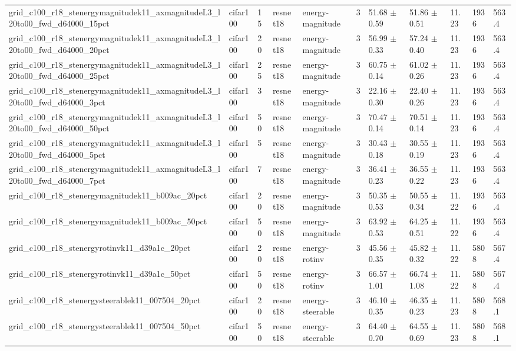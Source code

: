 \begin{tabular}{lllllllllll}
grid_c100_r18_stenergymagnitudek11_axmagnitudeL3_l20to00_fwd_d64000_15pct & cifar100 & 15 & resnet18 & energy-magnitude & 3 & 51.68 $\pm$ 0.59 & 51.86 $\pm$ 0.51 & 11.23 & 1936 & 563.4 \\
grid_c100_r18_stenergymagnitudek11_axmagnitudeL3_l20to00_fwd_d64000_20pct & cifar100 & 20 & resnet18 & energy-magnitude & 3 & 56.99 $\pm$ 0.33 & 57.24 $\pm$ 0.40 & 11.23 & 1936 & 563.4 \\
grid_c100_r18_stenergymagnitudek11_axmagnitudeL3_l20to00_fwd_d64000_25pct & cifar100 & 25 & resnet18 & energy-magnitude & 3 & 60.75 $\pm$ 0.14 & 61.02 $\pm$ 0.26 & 11.23 & 1936 & 563.4 \\
grid_c100_r18_stenergymagnitudek11_axmagnitudeL3_l20to00_fwd_d64000_3pct & cifar100 & 3 & resnet18 & energy-magnitude & 3 & 22.16 $\pm$ 0.30 & 22.40 $\pm$ 0.26 & 11.23 & 1936 & 563.4 \\
grid_c100_r18_stenergymagnitudek11_axmagnitudeL3_l20to00_fwd_d64000_50pct & cifar100 & 50 & resnet18 & energy-magnitude & 3 & 70.47 $\pm$ 0.14 & 70.51 $\pm$ 0.14 & 11.23 & 1936 & 563.4 \\
grid_c100_r18_stenergymagnitudek11_axmagnitudeL3_l20to00_fwd_d64000_5pct & cifar100 & 5 & resnet18 & energy-magnitude & 3 & 30.43 $\pm$ 0.18 & 30.55 $\pm$ 0.19 & 11.23 & 1936 & 563.4 \\
grid_c100_r18_stenergymagnitudek11_axmagnitudeL3_l20to00_fwd_d64000_7pct & cifar100 & 7 & resnet18 & energy-magnitude & 3 & 36.41 $\pm$ 0.23 & 36.55 $\pm$ 0.22 & 11.23 & 1936 & 563.4 \\
grid_c100_r18_stenergymagnitudek11_b009ac_20pct & cifar100 & 20 & resnet18 & energy-magnitude & 3 & 50.35 $\pm$ 0.53 & 50.55 $\pm$ 0.34 & 11.22 & 1936 & 563.4 \\
grid_c100_r18_stenergymagnitudek11_b009ac_50pct & cifar100 & 50 & resnet18 & energy-magnitude & 3 & 63.92 $\pm$ 0.53 & 64.25 $\pm$ 0.51 & 11.22 & 1936 & 563.4 \\
grid_c100_r18_stenergyrotinvk11_d39a1c_20pct & cifar100 & 20 & resnet18 & energy-rotinv & 3 & 45.56 $\pm$ 0.35 & 45.82 $\pm$ 0.32 & 11.22 & 5808 & 567.4 \\
grid_c100_r18_stenergyrotinvk11_d39a1c_50pct & cifar100 & 50 & resnet18 & energy-rotinv & 3 & 66.57 $\pm$ 1.01 & 66.74 $\pm$ 1.08 & 11.22 & 5808 & 567.4 \\
grid_c100_r18_stenergysteerablek11_007504_20pct & cifar100 & 20 & resnet18 & energy-steerable & 3 & 46.10 $\pm$ 0.35 & 46.35 $\pm$ 0.23 & 11.23 & 5808 & 568.1 \\
grid_c100_r18_stenergysteerablek11_007504_50pct & cifar100 & 50 & resnet18 & energy-steerable & 3 & 64.40 $\pm$ 0.70 & 64.55 $\pm$ 0.69 & 11.23 & 5808 & 568.1 \\

\end{tabular}
